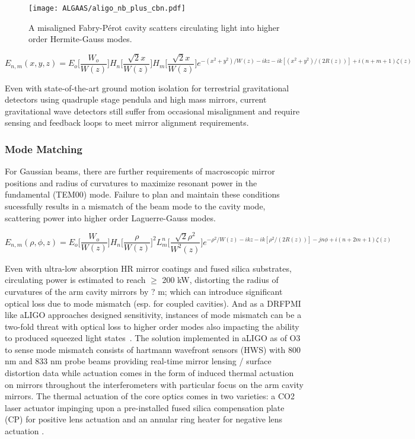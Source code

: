 {\begin{figure}[H]
    \begin{center}
    \texttt{[image: ALGAAS/aligo\_nb\_plus\_cbn.pdf]}
    \end{center}
    \caption{A misaligned Fabry-P\'{e}rot cavity scatters circulating light into higher order Hermite-Gauss modes.}
\label{fig:aligo_tn_comparison}
\end{figure}

\begin{equation}
	E_{n,m}(x,y,z) = E_o \bigg[ \frac{W_o}{W(z)} \bigg] H_n \bigg[ \frac{\sqrt{2}x}{W(z)} \bigg] H_m \bigg[ \frac{\sqrt{2}x}{W(z)} \bigg] e^{-(x^2 + y^2)/W(z) - ikz - ik[(x^2 + y^2)/(2R(z))] + i(n + m + 1)\zeta(z)}
\end{equation}

Even with state-of-the-art ground motion isolation for terrestrial gravitational detectors using quadruple stage pendula and high mass mirrors, current gravitational wave detectors still suffer from occasional misalignment and require sensing and feedback loops to meet mirror alignment requirements.

\subsubsection{Mode Matching}
For Gaussian beams, there are further requirements of macroscopic mirror positions and radius of curvatures to maximize resonant power in the fundamental (TEM00) mode. Failure to plan and maintain these conditions sucessfully results in a mismatch of the beam mode to the cavity mode, scattering power into higher order Laguerre-Gauss modes.  

\begin{equation}
	E_{n,m}(\rho, \phi, z) =  E_o \bigg[ \frac{W_o}{W(z)} \bigg] H_n \bigg[ \frac{\rho}{W(z)} \bigg]^2 L^n_m \bigg[ \frac{\sqrt{2}\rho^2}{W^2(z)} \bigg] e^{-\rho^2/W(z) - ikz - ik[\rho^2/(2R(z))] - jn \phi + i(n + 2m + 1)\zeta(z)}
\end{equation}

Even with ultra-low absorption HR mirror coatings and fused silica substrates, circulating power is estimated to reach $\geq$ 200 kW, distorting the radius of curvatures of the arm cavity mirrors by ? m; which can introduce significant optical loss due to mode mismatch (esp. for coupled cavities). And as a DRFPMI like aLIGO approaches designed sensitivity, instances of mode mismatch can be a two-fold threat with optical loss to higher order modes also impacting the ability to produced squeezed light states~\cite{}. The solution implemented in aLIGO as of O3 to sense mode mismatch consists of hartmann wavefront sensors (HWS) with 800 nm and 833 nm probe beams providing real-time mirror lensing / surface distortion data while actuation comes in the form of induced thermal actuation on mirrors throughout the interferometers with particular focus on the arm cavity mirrors. The thermal actuation of the core optics comes in two varieties: a CO2 laser actuator impinging upon a pre-installed fused silica compensation plate (CP) for positive lens actuation and an annular ring heater for negative lens actuation \cite{}. 

}
